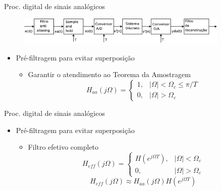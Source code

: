 \begin{slide}{Proc. digital de sinais anal\'ogicos}
 \begin{figure}
      \centering
      \includegraphics[width=0.9\textwidth]{figs/diagrama_completo.eps}
   \end{figure}
\begin{itemize}
   \item Pré-filtragem para evitar superposição
   \begin{itemize}
      \item Garantir o atendimento ao Teorema da Amostragem
      \begin{equation}
         H_{aa}(j\Omega) = \begin{cases}1, & |\Omega|<\Omega_c\leq \pi/T \\ 0, & |\Omega|>\Omega_c                          \end{cases}
      \end{equation}
   \end{itemize}
\end{itemize}
\end{slide}

\begin{slide}{Proc. digital de sinais anal\'ogicos}
\begin{itemize}
 \item Pré-filtragem para evitar superposição
   \begin{itemize}
      \item Filtro efetivo completo
      \begin{equation}
         H_{eff}(j\Omega) = \begin{cases}H(e^{j\Omega T}), & |\Omega|<\Omega_c\\ 0, & |\Omega|>\Omega_c                          \end{cases}
      \end{equation}
      \begin{equation}
         H_{eff}(j\Omega) \approx H_{aa}(j\Omega) H(e^{j\Omega T})
      \end{equation}
   \end{itemize}
\end{itemize}
\end{slide}


